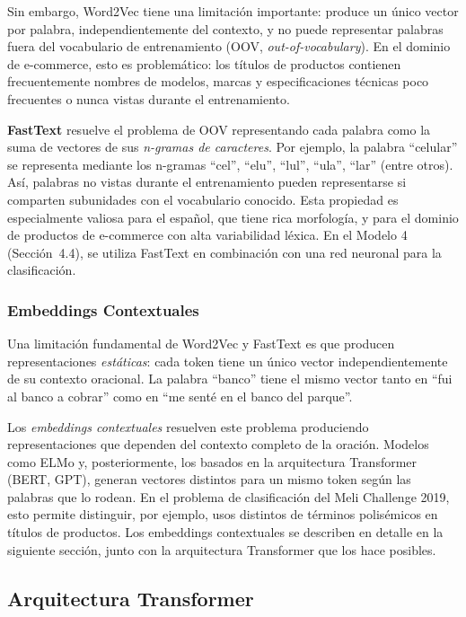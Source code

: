 \documentclass[11pt,a4paper]{article}
\begin{document}
Sin embargo, Word2Vec tiene una limitación importante: produce un único vector por palabra, independientemente del contexto, y no puede representar palabras fuera del vocabulario de entrenamiento (OOV, \textit{out-of-vocabulary}). En el dominio de e-commerce, esto es problemático: los títulos de productos contienen frecuentemente nombres de modelos, marcas y especificaciones técnicas poco frecuentes o nunca vistas durante el entrenamiento.

\textbf{FastText} \cite{bojanowski2017} resuelve el problema de OOV representando cada palabra como la suma de vectores de sus \emph{n-gramas de caracteres}. Por ejemplo, la palabra ``celular'' se representa mediante los n-gramas ``cel'', ``elu'', ``lul'', ``ula'', ``lar'' (entre otros). Así, palabras no vistas durante el entrenamiento pueden representarse si comparten subunidades con el vocabulario conocido. Esta propiedad es especialmente valiosa para el español, que tiene rica morfología, y para el dominio de productos de e-commerce con alta variabilidad léxica. En el Modelo 4 (Sección~4.4), se utiliza FastText en combinación con una red neuronal para la clasificación.

\subsubsection{Embeddings Contextuales}

Una limitación fundamental de Word2Vec y FastText es que producen representaciones \emph{estáticas}: cada token tiene un único vector independientemente de su contexto oracional. La palabra ``banco'' tiene el mismo vector tanto en ``fui al banco a cobrar'' como en ``me senté en el banco del parque''.

Los \emph{embeddings contextuales} resuelven este problema produciendo representaciones que dependen del contexto completo de la oración. Modelos como ELMo \cite{peters2018} y, posteriormente, los basados en la arquitectura Transformer (BERT, GPT), generan vectores distintos para un mismo token según las palabras que lo rodean. En el problema de clasificación del Meli Challenge 2019, esto permite distinguir, por ejemplo, usos distintos de términos polisémicos en títulos de productos. Los embeddings contextuales se describen en detalle en la siguiente sección, junto con la arquitectura Transformer que los hace posibles.

\subsection{Arquitectura Transformer}
\label{sec:transformer}
\end{document}
